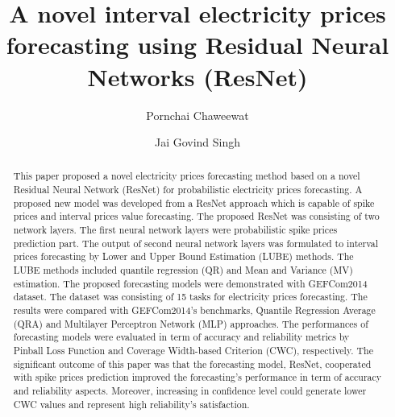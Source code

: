 \documentclass[review]{elsarticle}
\begin{document}
  \begin{frontmatter}

    \title{A novel interval electricity prices forecasting using Residual Neural Networks (ResNet)}

    \author{Pornchai Chaweewat}
    \author{Jai Govind Singh}

    \address{Department of Energy, Environmental and Climate Change, School of Environmental, Resource and Development, Asian Institute of Thechnology, Thailand}


    \begin{abstract}
      This paper proposed a novel electricity prices forecasting method based on a novel Residual Neural Network (ResNet) for probabilistic electricity prices forecasting.
      A proposed new model was developed from a ResNet approach which is capable of spike prices and interval prices value forecasting.
      The proposed ResNet was consisting of two network layers.
      The first neural network layers were probabilistic spike prices prediction part.
      The output of second neural network layers was formulated to interval prices forecasting by Lower and Upper Bound Estimation (LUBE) methods.
      The LUBE methods included quantile regression (QR) and Mean and Variance (MV) estimation.
      The proposed forecasting models were demonstrated with GEFCom2014 dataset.
      The dataset was consisting of 15 tasks for electricity prices forecasting.
      The results were compared with GEFCom2014's benchmarks, Quantile Regression Average (QRA) and Multilayer Perceptron Network (MLP) approaches.
      The performances of forecasting models were evaluated in term of accuracy and reliability metrics by Pinball Loss Function and Coverage Width-based Criterion (CWC), respectively.
      The significant outcome of this paper was that the forecasting model, ResNet, cooperated with spike prices prediction improved the forecasting's performance in term of accuracy and reliability aspects.
      Moreover, increasing in confidence level could generate lower CWC values and represent high reliability's satisfaction.
    \end{abstract}


\end{frontmatter}
\end{document}
